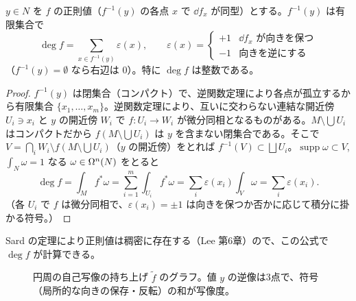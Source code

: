 \begin{thm}[正則値による計算]\label{B:thm:degreg}\tP
$y\in N$ を $f$ の正則値（$f^{-1}(y)$ の各点 $x$ で $\dd f_x$ が同型）とする。$f^{-1}(y)$ は有限集合で
\[
\deg f=\sum_{x\in f^{-1}(y)}\varepsilon(x),\qquad\varepsilon(x)=\begin{cases}+1&\dd f_x\text{ が向きを保つ}\\-1&\text{向きを逆にする}\end{cases}
\]
（$f^{-1}(y)=\emptyset$ なら右辺は $0$）。特に $\deg f$ は整数である。
\end{thm}
\begin{proof}
$f^{-1}(y)$ は閉集合（コンパクト）で、逆関数定理により各点が孤立するから有限集合 $\{x_1,\dots,x_m\}$。逆関数定理により、互いに交わらない連結な開近傍 $U_i\ni x_i$ と $y$ の開近傍 $W_i$ で $f:U_i\to W_i$ が微分同相となるものがある。$M\setminus\bigcup U_i$ はコンパクトだから $f(M\setminus\bigcup U_i)$ は $y$ を含まない閉集合である。そこで $V=\bigcap_iW_i\setminus f(M\setminus\bigcup U_i)$（$y$ の開近傍）をとれば $f^{-1}(V)\subset\bigsqcup U_i$。$\operatorname{supp}\omega\subset V$, $\int_N\omega=1$ なる $\omega\in\Omega^n(N)$ をとると
\[
\deg f=\int_Mf^*\omega=\sum_{i=1}^m\int_{U_i}f^*\omega=\sum_i\varepsilon(x_i)\int_{V}\omega=\sum_i\varepsilon(x_i).
\]
（各 $U_i$ で $f$ は微分同相で、$\varepsilon(x_i)=\pm1$ は向きを保つか否かに応じて積分に掛かる符号。）
\end{proof}
Sard の定理により正則値は稠密に存在する\tC（Lee 第6章）ので、この公式で $\deg f$ が計算できる。

\begin{figure}[ht]
\centering
{}
\caption{円周の自己写像の持ち上げ $\tilde f$ のグラフ。値 $y$ の逆像は3点で、符号（局所的な向きの保存・反転）の和が写像度。}\label{B:fig:degree}
\end{figure}

